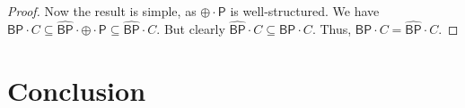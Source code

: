 \documentclass[11pt]{article}
\newcommand{\bp}{\textsf{BP}}
\newcommand{\strongbp}{\widehat{\textsf{BP}}}
\newcommand{\parity}{\oplus}
\newcommand{\p}{\textsf{P}}
\begin{document}
\begin{proof}
Now the result is simple, as $\parity \cdot \p$ is well-structured. We have $\bp \cdot C\subseteq \strongbp \cdot \parity \cdot \p \subseteq \strongbp \cdot C$. But clearly $\strongbp \cdot C \subseteq \bp \cdot C$. Thus, $\bp\cdot C = \strongbp \cdot C$.



\end{proof}

\section{Conclusion}

\pagebreak
\end{document}
